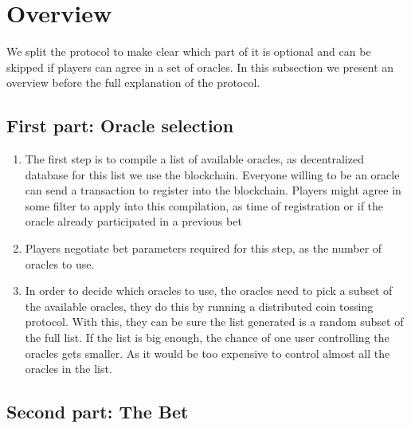 \section{Overview}

We split the protocol to make clear which part of it is optional and can be
  skipped if players can agree in a set of oracles.
In this subsection we present an overview before the full explanation of the
  protocol.

\subsection{First part: Oracle selection}

\begin{enumerate}
  \item The first step is to compile a list of available oracles, as
      decentralized database for this list we use the blockchain. Everyone
      willing to be an oracle can send a transaction to register into the
      blockchain. Players might agree in some filter to apply into this
      compilation, as time of registration or if the oracle already
      participated in a previous bet
  \item Players negotiate bet parameters required for this step, as the number
      of oracles to use.
  \item In order to decide which oracles to use, the oracles need to pick a
      subset of the available oracles, they do this by running a distributed
      coin tossing protocol.
    With this, they can be sure the list generated is a random subset of the
      full list. If the list is big enough, the chance of one user controlling
      the oracles gets smaller. As it would be too expensive to control almost
      all the oracles in the list.
\end{enumerate}

\subsection{Second part: The Bet}

